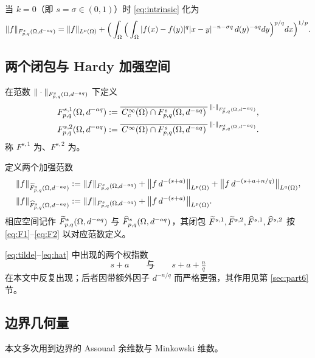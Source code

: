 当 $k=0$（即 $s=\sigma\in(0,1)$）时 \eqref{eq:intrinsic} 化为
\begin{equation}\label{eq:intrinsic-k0}
  \|f\|_{F^{s}_{p,q}(\Omega,d^{-aq})}
  =\|f\|_{L^p(\Omega)}
  +\Big(\int_\Omega\Big(\int_\Omega |f(x)-f(y)|^q|x-y|^{-n-\sigma q}\,d(y)^{-aq}dy\Big)^{p/q}dx\Big)^{1/p}.
\end{equation}

\subsection{两个闭包与 Hardy 加强空间}

\begin{definition}\label{def:closures}
在范数 $\|\cdot\|_{F^{s}_{p,q}(\Omega,d^{-aq})}$ 下定义
\begin{align}
  F^{s,1}_{p,q}(\Omega,d^{-aq})&:=\overline{\,C_c^\infty(\Omega)\cap F^{s}_{p,q}(\Omega,d^{-aq})\,}^{\;\|\cdot\|_{F^{s}_{p,q}(\Omega,d^{-aq})}},\label{eq:F1}\\
  F^{s,2}_{p,q}(\Omega,d^{-aq})&:=\overline{\,C^\infty(\Omega)\cap F^{s}_{p,q}(\Omega,d^{-aq})\,}^{\;\|\cdot\|_{F^{s}_{p,q}(\Omega,d^{-aq})}}.\label{eq:F2}
\end{align}
称 $F^{s,1}$ 为、$F^{s,2}$ 为。
\end{definition}

\begin{definition}\label{def:hardy}
定义两个加强范数
\begin{align}
  \|f\|_{\widetilde F^{s}_{p,q}(\Omega,d^{-aq})}&:=\|f\|_{F^{s}_{p,q}(\Omega,d^{-aq})}
    +\big\|f\,d^{-(s+a)}\big\|_{L^p(\Omega)}
    +\big\|f\,d^{-(s+a+n/q)}\big\|_{L^q(\Omega)},\label{eq:tilde}\\
  \|f\|_{\widehat F^{s}_{p,q}(\Omega,d^{-aq})}&:=\|f\|_{F^{s}_{p,q}(\Omega,d^{-aq})}
    +\big\|f\,d^{-(s+a)}\big\|_{L^p(\Omega)}.\label{eq:hat}
\end{align}
相应空间记作 $\widetilde F^{s}_{p,q}(\Omega,d^{-aq})$ 与 $\widehat F^{s}_{p,q}(\Omega,d^{-aq})$，其闭包
$\widetilde F^{s,1},\widetilde F^{s,2},\widehat F^{s,1},\widehat F^{s,2}$
按 \eqref{eq:F1}--\eqref{eq:F2} 以对应范数定义。
\end{definition}

\begin{notation}
\eqref{eq:tilde}--\eqref{eq:hat} 中出现的两个权指数
\[
  s+a \qquad\text{与}\qquad s+a+\tfrac{n}{q}
\]
在本文中反复出现；后者因带额外因子 $d^{-n/q}$ 而严格更强，其作用见第
\ref{sec:part6} 节。
\end{notation}

\subsection{边界几何量}

本文多次用到边界的 Assouad 余维数与 Minkowski 维数。

